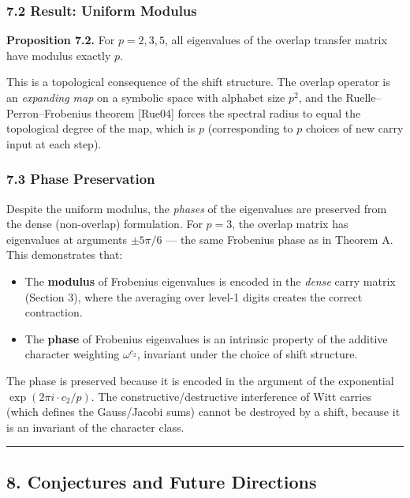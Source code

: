 \documentclass[
  11pt,
]{article}
\providecommand{\tightlist}{%
  \setlength{\itemsep}{0pt}\setlength{\parskip}{0pt}}
\begin{document}
\subsubsection{7.2 Result: Uniform Modulus}\label{result-uniform-modulus}

\textbf{Proposition 7.2.} For \(p = 2, 3, 5\), all eigenvalues of the overlap
transfer matrix have modulus exactly \(p\).

This is a topological consequence of the shift structure. The overlap operator
is an \emph{expanding map} on a symbolic space with alphabet size \(p^2\), and
the Ruelle--Perron--Frobenius theorem {[}Rue04{]} forces the spectral radius to
equal the topological degree of the map, which is \(p\) (corresponding to \(p\)
choices of new carry input at each step).

\subsubsection{7.3 Phase Preservation}\label{phase-preservation}

Despite the uniform modulus, the \emph{phases} of the eigenvalues are preserved
from the dense (non-overlap) formulation. For \(p = 3\), the overlap matrix has
eigenvalues at arguments \(\pm 5\pi/6\) --- the same Frobenius phase as in
Theorem A. This demonstrates that:

\begin{itemize}
\tightlist
\item
  The \textbf{modulus} of Frobenius eigenvalues is encoded in the \emph{dense}
  carry matrix (Section 3), where the averaging over level-1 digits creates the
  correct contraction.
\item
  The \textbf{phase} of Frobenius eigenvalues is an intrinsic property of the
  additive character weighting \(\omega^{c_2}\), invariant under the choice of
  shift structure.
\end{itemize}

The phase is preserved because it is encoded in the argument of the exponential
\(\exp(2\pi i \cdot c_2/p)\). The constructive/destructive interference of Witt
carries (which defines the Gauss/Jacobi sums) cannot be destroyed by a shift,
because it is an invariant of the character class.

\begin{center}\rule{0.5\linewidth}{0.5pt}\end{center}

\newpage

\subsection{8. Conjectures and Future
Directions}\label{conjectures-and-future-directions}
\end{document}
